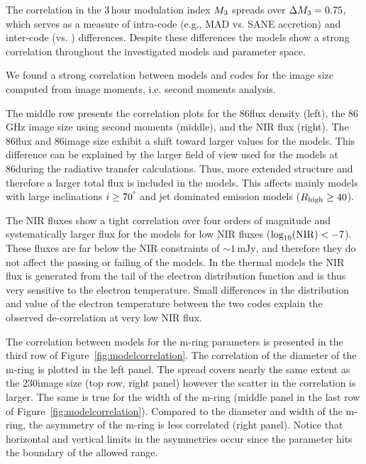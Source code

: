 The correlation in the 3\,hour modulation index $M_{3}$ spreads over $\Delta M_{3}=0.75$, which serves as a measure of intra-code (e.g., MAD vs. SANE accretion) and inter-code (\bhac vs. \kharma) differences.
Despite these differences the models show a strong correlation throughout the investigated models and parameter space.

We found a strong correlation between models and codes for the image size computed from image moments, i.e. second moments analysis.

The middle row presents the correlation plots for the 86\GHz flux density (left), the 86\,GHz image size using second moments (middle), and the NIR flux (right).
The 86\GHz flux and 86\GHz image size exhibit a shift toward larger values for the \bhac models.
This difference can be explained by the larger field of view used for the \bhac models at 86\GHz during the radiative transfer calculations.
Thus, more extended structure and therefore a larger total flux is included in the \bhac models.
This affects mainly models with large inclinations $i\geq70^\degree$ and jet dominated emission models ($R_\mathrm{high} \geq 40$).

The NIR fluxes show a tight correlation over four orders of magnitude and systematically larger flux for the \bhac models for low NIR fluxes ($\log_{10}({\rm NIR}) < -7$).
These fluxes are far below the NIR constraints of $\sim 1\,\mathrm{mJy}$, and therefore they do not affect the passing or failing of the models.
In the thermal models the NIR flux is generated from the tail of the electron distribution function and is thus very sensitive to the electron temperature.
Small differences in the distribution and value of the electron temperature between the two codes explain the observed de-correlation at very low NIR flux.

The correlation between models for the m-ring parameters is presented in the third row of Figure~\ref{fig:modelcorrelation}.
The correlation of the diameter of the m-ring is plotted in the left panel.
The spread covers nearly the same extent as the 230\GHz image size (top row, right panel) however the scatter in the correlation is larger.
The same is true for the width of the m-ring (middle panel in the last row of Figure~\ref{fig:modelcorrelation}).
Compared to the diameter and width of the m-ring, the asymmetry of the m-ring is less correlated (right panel).
Notice that horizontal and vertical limits in the asymmetries occur since the parameter hits the boundary of the allowed range.

